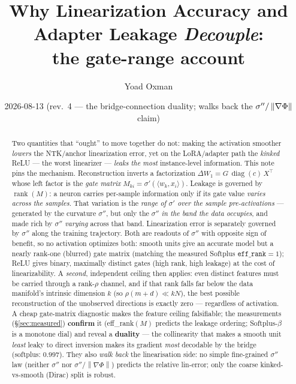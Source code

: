 \documentclass[11pt]{article}
\title{Why Linearization Accuracy and Adapter Leakage \emph{Decouple}:\\
the gate-range account}
\author{Yoad Oxman}
\date{2026-08-13 (rev.\ 4 --- the bridge-connection duality; walks back the $\sigma''/\norm{\nabla\Phi}$ claim)}
\newcommand{\dW}{\Delta W}
\newcommand{\norm}[1]{\left\lVert #1 \right\rVert}
\newcommand{\ip}[2]{\langle #1, #2\rangle}
\newcommand{\rank}{\operatorname{rank}}
\newcommand{\diag}{\operatorname{diag}}
\begin{document}
\maketitle

\begin{abstract}
Two quantities that ``ought'' to move together do not: making the activation smoother \emph{lowers}
the NTK/anchor linearization error, yet on the LoRA/adapter path the \emph{kinked} ReLU --- the worst
linearizer --- \emph{leaks the most} instance-level information. This note pins the mechanism.
Reconstruction inverts a factorization $\dW_1 = G\,\diag(c)\,X^\top$ whose left factor is the
\emph{gate matrix} $M_{ki}=\sigma'(\ip{w_k}{x_i})$. Leakage is governed by $\rank(M)$: a neuron carries
per-sample information only if its gate value \emph{varies across the samples}. That variation is the
\emph{range of $\sigma'$ over the sample pre-activations} --- generated by the curvature $\sigma''$, but
only the $\sigma''$ \emph{in the band the data occupies}, and made rich by $\sigma''$ \emph{varying}
across that band. Linearization error is separately governed by $\sigma''$ along the training
trajectory. Both are readouts of $\sigma''$ with opposite sign of benefit, so no activation optimizes
both: smooth units give an accurate model but a nearly rank-one (blurred) gate matrix (matching the
measured Softplus $\texttt{eff\_rank}=1$); ReLU gives binary, maximally distinct gates (high rank,
high leakage) at the cost of linearizability. A \emph{second}, independent ceiling then applies: even
distinct features must be carried through a rank-$\rho$ channel, and if that rank falls far below the
data manifold's intrinsic dimension $k$ (so $\rho(m+d)\ll kN$), the best possible reconstruction of the
unobserved directions is exactly zero --- regardless of activation. A cheap gate-matrix diagnostic makes
the feature ceiling falsifiable; the measurements (\S\ref{sec:measured}) \textbf{confirm} it (eff\_rank$(M)$
predicts the leakage ordering; Softplus-$\beta$ is a monotone dial) and reveal a \textbf{duality} --- the
collinearity that makes a smooth unit \emph{least} leaky to direct inversion makes its gradient
\emph{most} decodable by the bridge (softplus: $0.997$). They also \emph{walk back} the linearisation
side: no simple fine-grained $\sigma''$ law (neither $\sigma''$ nor $\sigma''/\norm{\nabla\Phi}$) predicts
the relative lin-error; only the coarse kinked-vs-smooth (Dirac) split is robust.
\end{abstract}
\end{document}
